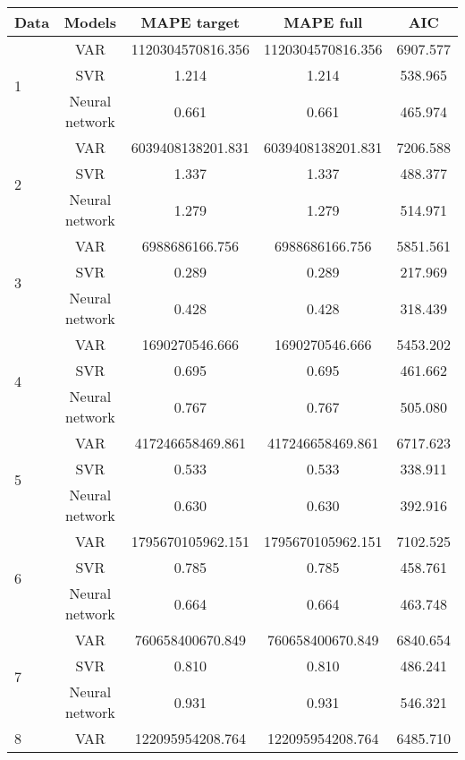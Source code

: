 \documentclass[12pt]{article}
\begin{document}
\begin{longtable}{|p{2cm}|c|c|c|c|}
\hline
Data & Models & MAPE target & MAPE full & AIC\\
\hline
\multirow{3}{*}{1} &VAR &   1120304570816.356 &    1120304570816.356 &    6907.577\\
\cline{2-5}
 &SVR &   1.214 &    1.214 &    538.965\\
\cline{2-5}
 &Neural network &   0.661 &    0.661 &    465.974\\
\cline{2-5}
\hline
\multirow{3}{*}{2} &VAR &   6039408138201.831 &    6039408138201.831 &    7206.588\\
\cline{2-5}
 &SVR &   1.337 &    1.337 &    488.377\\
\cline{2-5}
 &Neural network &   1.279 &    1.279 &    514.971\\
\cline{2-5}
\hline
\multirow{3}{*}{3} &VAR &   6988686166.756 &    6988686166.756 &    5851.561\\
\cline{2-5}
 &SVR &   0.289 &    0.289 &    217.969\\
\cline{2-5}
 &Neural network &   0.428 &    0.428 &    318.439\\
\cline{2-5}
\hline
\multirow{3}{*}{4} &VAR &   1690270546.666 &    1690270546.666 &    5453.202\\
\cline{2-5}
 &SVR &   0.695 &    0.695 &    461.662\\
\cline{2-5}
 &Neural network &   0.767 &    0.767 &    505.080\\
\cline{2-5}
\hline
\multirow{3}{*}{5} &VAR &   417246658469.861 &    417246658469.861 &    6717.623\\
\cline{2-5}
 &SVR &   0.533 &    0.533 &    338.911\\
\cline{2-5}
 &Neural network &   0.630 &    0.630 &    392.916\\
\cline{2-5}
\hline
\multirow{3}{*}{6} &VAR &   1795670105962.151 &    1795670105962.151 &    7102.525\\
\cline{2-5}
 &SVR &   0.785 &    0.785 &    458.761\\
\cline{2-5}
 &Neural network &   0.664 &    0.664 &    463.748\\
\cline{2-5}
\hline
\multirow{3}{*}{7} &VAR &   760658400670.849 &    760658400670.849 &    6840.654\\
\cline{2-5}
 &SVR &   0.810 &    0.810 &    486.241\\
\cline{2-5}
 &Neural network &   0.931 &    0.931 &    546.321\\
\cline{2-5}
\hline
\multirow{3}{*}{8} &VAR &   122095954208.764 &    122095954208.764 &    6485.710\\

\end{longtable}
\end{document}
